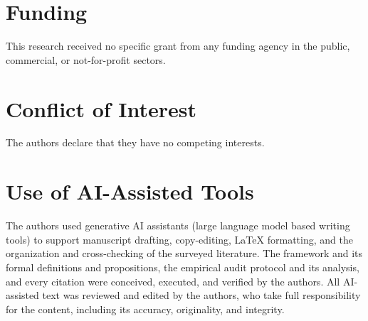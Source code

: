 \documentclass[acmsmall,nonacm]{acmart}
\begin{document}
\section*{Funding}

This research received no specific grant from any funding agency in the public, commercial, or not-for-profit sectors.

\section*{Conflict of Interest}

The authors declare that they have no competing interests.

\section*{Use of AI-Assisted Tools}

The authors used generative AI assistants (large language model based writing tools) to support manuscript drafting, copy-editing, LaTeX formatting, and the organization and cross-checking of the surveyed literature. The framework and its formal definitions and propositions, the empirical audit protocol and its analysis, and every citation were conceived, executed, and verified by the authors. All AI-assisted text was reviewed and edited by the authors, who take full responsibility for the content, including its accuracy, originality, and integrity.



\end{document}
